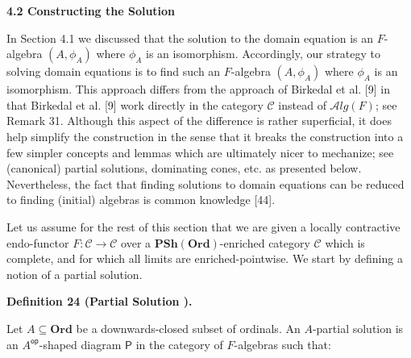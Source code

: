 \documentclass[10pt,a4paper]{article}
\begin{document}
 
 
 
 
\par\medskip\noindent\textbf{4.2 Constructing the Solution}\par
 
 
In Section 4.1 we discussed that the solution to the domain equation is an $F$-algebra $(A,\phi_{A})$ where $\phi_{A}$ is an isomorphism. Accordingly, our strategy to solving domain equations is to find such an $F$-algebra $(A,\phi_{A})$ where $\phi_{A}$ is an isomorphism. This approach differs from the approach of Birkedal et al. [9] in that Birkedal et al. [9] work directly in the category $\mathcal{C}$ instead of $\mathcal{A}lg(F)$; see Remark 31. Although this aspect of the difference is rather superficial, it does help simplify the construction in the sense that it breaks the construction into a few simpler concepts and lemmas which are ultimately nicer to mechanize; see (canonical) partial solutions, dominating cones, etc. as presented below. Nevertheless, the fact that finding solutions to domain equations can be reduced to finding (initial) algebras is common knowledge [44].\par
 
 

 
Let us assume for the rest of this section that we are given a locally contractive endo-functor $F:\mathcal{C}\to\mathcal{C}$ over a $\mathbf{PSh}(\mathbf{Ord})$-enriched category $\mathcal{C}$ which is complete, and for which all limits are enriched-pointwise. We start by defining a notion of a partial solution.\par
 

 
 
\par\medskip\noindent\textbf{Definition 24 (Partial Solution ).}\par
 
 
Let $A\subseteq\mathbf{Ord}$ be a downwards-closed subset of ordinals. An $A$-partial solution is an ${A}^{\mathsf{op}}$-shaped diagram $\boldsymbol{\mathsf{P}}$ in the category of $F$-algebras such that:\par
  
\end{document}
